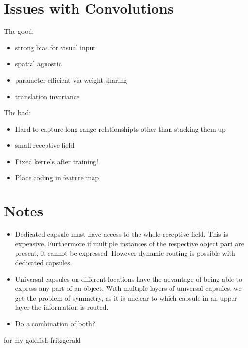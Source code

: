 \documentclass{article}
\begin{document}
\section{Issues with Convolutions}
The good:
\begin{itemize}
	\item strong bias for visual input
	\item spatial agnostic
	\item parameter efficient via weight sharing
	\item translation invariance
\end{itemize}

The bad:
\begin{itemize}
	\item Hard to capture long range relationshipts other than stacking them up
	\item small receptive field
	\item Fixed kernels after training!
	\item Place coding in feature map
\end{itemize}

\section{Notes}

\begin{itemize}
	\item Dedicated capsule must have access to the whole receptive field. This is expensive. Furthermore if multiple instances of the respective object part are present, it cannot be expressed. However dynamic routing is possible with dedicated capsules.
	\item Universal capsules on different locations have the advantage of being able to express any part of an object. With multiple layers of universal capsules, we get the problem of symmetry, as it is unclear to which capsule in an upper layer the information is routed.
	\item Do a combination of both?
\end{itemize}

\begin{ack}
for my goldfish fritzgerald
\end{ack}



\end{document}
